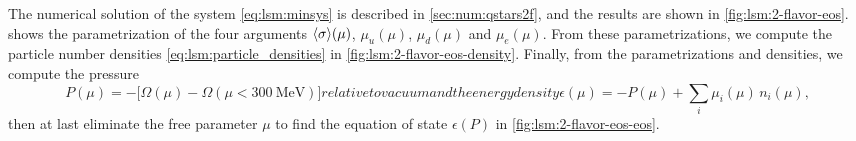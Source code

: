 The numerical solution of the system \eqref{eq:lsm:minsys} is described in \cref{sec:num:qstars2f}, and the results are shown in \cref{fig:lsm:2-flavor-eos}.
 shows the parametrization of the four arguments $\langle \sigma \rangle(\mu)$, $\mu_u(\mu)$, $\mu_d(\mu)$ and $\mu_e(\mu)$.
From these parametrizations, we compute the particle number densities \eqref{eq:lsm:particle_densities} in \cref{fig:lsm:2-flavor-eos-density}.
Finally, from the parametrizations and densities, we compute the pressure
\begin{subequations}
\begin{equation}
	P(\mu) = -\Big[\Omega(\mu) - \Omega(\mu<\SI{300}{\mega\electronvolt})\Big]
\label{eq:lsm:pressure_bagless}
\end{equation}
relative to vacuum and the energy density
\begin{equation}
	\epsilon(\mu) = -P(\mu) + \sum_i \mu_i(\mu) \, n_i(\mu) ,
\label{eq:lsm:energy_density_bagless}
\end{equation}%
\label{eq:lsm:eos}%
\end{subequations}%
then at last eliminate the free parameter $\mu$ to find the equation of state $\epsilon(P)$ in \cref{fig:lsm:2-flavor-eos-eos}.

